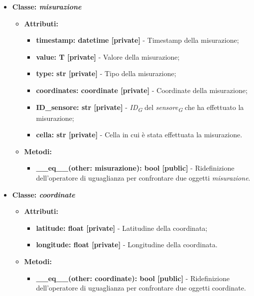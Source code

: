 \begin{itemize}
    \item\textbf{Classe: \textit{misurazione}}
    \begin{itemize}
        \item \textbf{Attributi:} 
    \begin{itemize}
        \item \textbf{timestamp: datetime [private]} - Timestamp della misurazione;
        \item \textbf{value: T [private]} - Valore della misurazione;
        \item \textbf{type: str [private]} - Tipo della misurazione;
        \item \textbf{coordinates: coordinate [private]} - Coordinate della misurazione;
        \item \textbf{ID\_sensore: str [private]} - \textit{ID}\textsubscript{\textit{G}} del \textit{sensore}\textsubscript{\textit{G}} che ha effettuato la misurazione;
        \item \textbf{cella: str [private]} - Cella in cui è stata effettuata la misurazione.
    \end{itemize}
    \item \textbf{Metodi:} 
    \begin{itemize}
        \item \textbf{\_\_eq\_\_(other: misurazione): bool [public]} - Ridefinizione dell'operatore di uguaglianza per confrontare due oggetti \textit{misurazione}.
    \end{itemize}
\end{itemize}

    \item\textbf{Classe: \textit{coordinate}}
    \begin{itemize}
        \item \textbf{Attributi:} 
    \begin{itemize}
        \item \textbf{latitude: float [private]} - Latitudine della coordinata;
        \item \textbf{longitude: float [private]} - Longitudine della coordinata.
    \end{itemize}
    \item     \textbf{Metodi:} 
    \begin{itemize}
        \item \textbf{\_\_eq\_\_(other: coordinate): bool [public]} - Ridefinizione dell'operatore di uguaglianza per confrontare due oggetti coordinate.
    \end{itemize}
\end{itemize}


\end{itemize}
